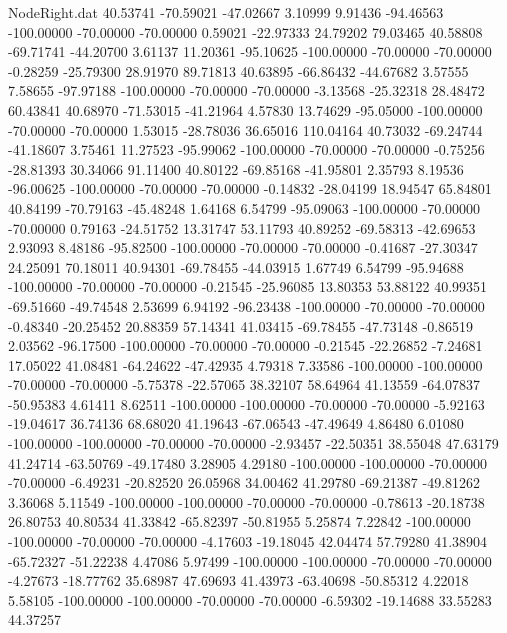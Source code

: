 \begin{filecontents}{NodeRight.dat}
  40.53741  -70.59021  -47.02667     3.10999    9.91436  -94.46563 -100.00000  -70.00000  -70.00000    0.59021  -22.97333   24.79202   79.03465
  40.58808  -69.71741  -44.20700     3.61137   11.20361  -95.10625 -100.00000  -70.00000  -70.00000   -0.28259  -25.79300   28.91970   89.71813
  40.63895  -66.86432  -44.67682     3.57555    7.58655  -97.97188 -100.00000  -70.00000  -70.00000   -3.13568  -25.32318   28.48472   60.43841
  40.68970  -71.53015  -41.21964     4.57830   13.74629  -95.05000 -100.00000  -70.00000  -70.00000    1.53015  -28.78036   36.65016  110.04164
  40.73032  -69.24744  -41.18607     3.75461   11.27523  -95.99062 -100.00000  -70.00000  -70.00000   -0.75256  -28.81393   30.34066   91.11400
  40.80122  -69.85168  -41.95801     2.35793    8.19536  -96.00625 -100.00000  -70.00000  -70.00000   -0.14832  -28.04199   18.94547   65.84801
  40.84199  -70.79163  -45.48248     1.64168    6.54799  -95.09063 -100.00000  -70.00000  -70.00000    0.79163  -24.51752   13.31747   53.11793
  40.89252  -69.58313  -42.69653     2.93093    8.48186  -95.82500 -100.00000  -70.00000  -70.00000   -0.41687  -27.30347   24.25091   70.18011
  40.94301  -69.78455  -44.03915     1.67749    6.54799  -95.94688 -100.00000  -70.00000  -70.00000   -0.21545  -25.96085   13.80353   53.88122
  40.99351  -69.51660  -49.74548     2.53699    6.94192  -96.23438 -100.00000  -70.00000  -70.00000   -0.48340  -20.25452   20.88359   57.14341
  41.03415  -69.78455  -47.73148    -0.86519    2.03562  -96.17500 -100.00000  -70.00000  -70.00000   -0.21545  -22.26852   -7.24681   17.05022
  41.08481  -64.24622  -47.42935     4.79318    7.33586 -100.00000 -100.00000  -70.00000  -70.00000   -5.75378  -22.57065   38.32107   58.64964
  41.13559  -64.07837  -50.95383     4.61411    8.62511 -100.00000 -100.00000  -70.00000  -70.00000   -5.92163  -19.04617   36.74136   68.68020
  41.19643  -67.06543  -47.49649     4.86480    6.01080 -100.00000 -100.00000  -70.00000  -70.00000   -2.93457  -22.50351   38.55048   47.63179
  41.24714  -63.50769  -49.17480     3.28905    4.29180 -100.00000 -100.00000  -70.00000  -70.00000   -6.49231  -20.82520   26.05968   34.00462
  41.29780  -69.21387  -49.81262     3.36068    5.11549 -100.00000 -100.00000  -70.00000  -70.00000   -0.78613  -20.18738   26.80753   40.80534
  41.33842  -65.82397  -50.81955     5.25874    7.22842 -100.00000 -100.00000  -70.00000  -70.00000   -4.17603  -19.18045   42.04474   57.79280
  41.38904  -65.72327  -51.22238     4.47086    5.97499 -100.00000 -100.00000  -70.00000  -70.00000   -4.27673  -18.77762   35.68987   47.69693
  41.43973  -63.40698  -50.85312     4.22018    5.58105 -100.00000 -100.00000  -70.00000  -70.00000   -6.59302  -19.14688   33.55283   44.37257

\end{filecontents}
